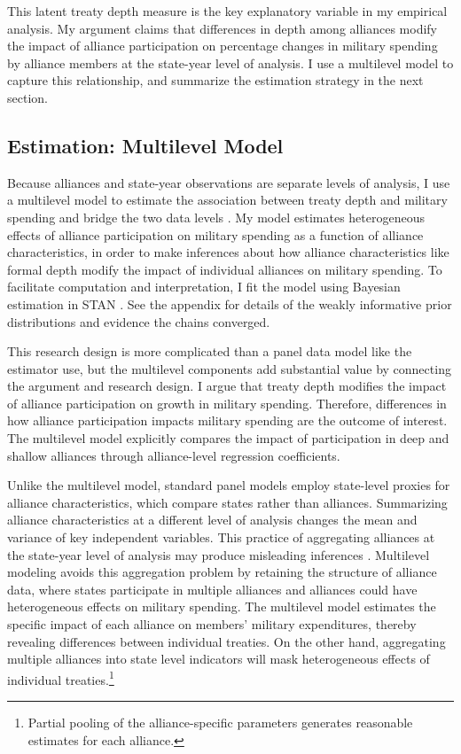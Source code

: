 \documentclass[12pt]{article}
\begin{document}
This latent treaty depth measure is the key explanatory variable in my empirical analysis. 
My argument claims that differences in depth among alliances modify the impact of alliance participation on percentage changes in military spending by alliance members at the state-year level of analysis. 
I use a multilevel model to capture this relationship, and summarize the estimation strategy in the next section. 


\subsection{Estimation: Multilevel Model} 


Because alliances and state-year observations are separate levels of analysis, I use a multilevel model to estimate the association between treaty depth and military spending and bridge the two data levels \citep{SteenbergenJones2002}. 
My model estimates heterogeneous effects of alliance participation on military spending as a function of alliance characteristics, in order to make inferences about how alliance characteristics like formal depth modify the impact of individual alliances on military spending.
To facilitate computation and interpretation, I fit the model using Bayesian estimation in STAN \citep{Carpenteretal2016}. 
See the appendix for details of the weakly informative prior distributions and evidence the chains converged.


This research design is more complicated than a panel data model like the estimator \citet{DigiuseppePoast2016} use, but the multilevel components add substantial value by connecting the argument and research design.
I argue that treaty depth modifies the impact of alliance participation on growth in military spending. 
Therefore, differences in how alliance participation impacts military spending are the outcome of interest.  
The multilevel model explicitly compares the impact of participation in deep and shallow alliances through alliance-level regression coefficients. 


Unlike the multilevel model, standard panel models employ state-level proxies for alliance characteristics, which compare states rather than alliances.
Summarizing alliance characteristics at a different level of analysis changes the mean and variance of key independent variables. 
This practice of aggregating alliances at the state-year level of analysis may produce misleading inferences \citep[pg. 356]{McElreath2016}.
Multilevel modeling avoids this aggregation problem by retaining the structure of alliance data, where states participate in multiple alliances and alliances could have heterogeneous effects on military spending.
The multilevel model estimates the specific impact of each alliance on members' military expenditures, thereby revealing differences between individual treaties. 
On the other hand, aggregating multiple alliances into state level indicators will mask heterogeneous effects of individual treaties.\footnote{Partial pooling of the alliance-specific parameters generates reasonable estimates for each alliance.} 
\end{document}
